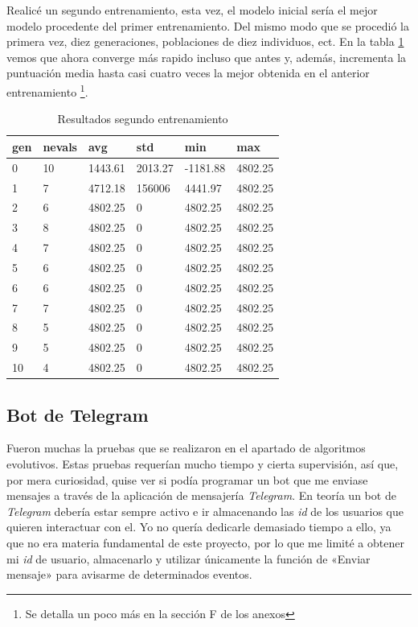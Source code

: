 Realicé un segundo entrenamiento, esta vez, el modelo inicial sería el mejor modelo procedente del primer entrenamiento. Del mismo modo que se procedió la primera vez, diez generaciones, poblaciones de diez individuos, ect. En la tabla \ref{result_segundo_entr} vemos que ahora converge más rapido incluso que antes y, además, incrementa la puntuación media hasta casi cuatro veces la mejor obtenida en el anterior entrenamiento \footnote{Se detalla un poco más en la sección F de los anexos}.


\begin{table}[]
\centering
\begin{tabular}{|l|l|l|l|l|l|}
\hline
\rowcolor[HTML]{C0C0C0} 
gen & nevals & avg     & std     & min      & max     \\ \hline
0   & 10     & 1443.61 & 2013.27 & -1181.88 & 4802.25 \\ \hline
1   & 7      & 4712.18 & 156006  & 4441.97  & 4802.25 \\ \hline
2   & 6      & 4802.25 & 0       & 4802.25  & 4802.25 \\ \hline
3   & 8      & 4802.25 & 0       & 4802.25  & 4802.25 \\ \hline
4   & 7      & 4802.25 & 0       & 4802.25  & 4802.25 \\ \hline
5   & 6      & 4802.25 & 0       & 4802.25  & 4802.25 \\ \hline
6   & 6      & 4802.25 & 0       & 4802.25  & 4802.25 \\ \hline
7   & 7      & 4802.25 & 0       & 4802.25  & 4802.25 \\ \hline
8   & 5      & 4802.25 & 0       & 4802.25  & 4802.25 \\ \hline
9   & 5      & 4802.25 & 0       & 4802.25  & 4802.25 \\ \hline
10  & 4      & 4802.25 & 0       & 4802.25  & 4802.25 \\ \hline
\end{tabular}
\caption{Resultados segundo entrenamiento}
\label{result_segundo_entr}
\end{table}


\subsection{Bot de Telegram}
Fueron muchas la pruebas que se realizaron en el apartado de algoritmos evolutivos. Estas pruebas requerían mucho tiempo y cierta supervisión, así que, por mera curiosidad, quise ver si podía programar un bot que me enviase mensajes a través de la aplicación de mensajería \emph{Telegram}. 
En teoría un bot de \emph{Telegram} debería estar sempre activo e ir almacenando las \emph{id}  de los usuarios que quieren interactuar con el. Yo no quería dedicarle demasiado tiempo a ello, ya que no era materia fundamental de este proyecto, por lo que me limité a obtener mi \emph{id} de usuario, almacenarlo y utilizar únicamente la función de «Enviar mensaje» para avisarme de determinados eventos.


